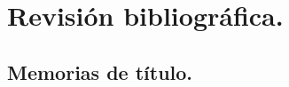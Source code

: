 \documentclass[letterpaper,12pt]{article}
\begin{document}
\section{Revisión bibliográfica.}

\subsection{Memorias de título.}
%
\end{document}
